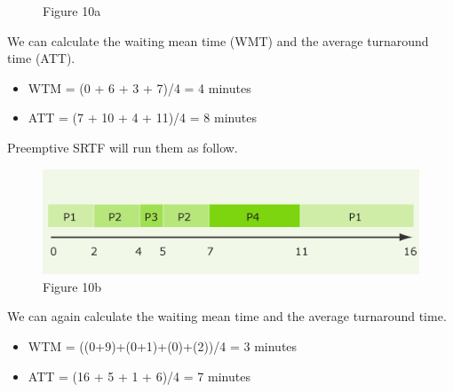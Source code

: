 \documentclass[11pt,a4paper]{scrreprt}
\begin{document}
\begin{itemize}
\begin{figure}[!ht]
\caption{Figure 10a}
\label{fig:figure10a}
\end{figure}
We can calculate the waiting mean time (WMT) and the average turnaround time (ATT).
\begin{itemize}
\item WTM = (0 + 6 + 3 + 7)/4 = 4 minutes
\item ATT = (7 + 10 + 4 + 11)/4 = 8 minutes
\end{itemize}
Preemptive SRTF will run them as follow.
\begin{figure}[!ht]
\centering
\includegraphics[width=0.65\linewidth]{img/Fig10b.png}
\caption{Figure 10b}
\label{fig:figure10b}
\end{figure}
We can again calculate the waiting mean time and the average turnaround time.
\begin{itemize}
\item WTM = ((0+9)+(0+1)+(0)+(2))/4 = 3 minutes
\item ATT = (16 + 5 + 1 + 6)/4 = 7 minutes
\end{itemize}


\end{itemize}
\end{document}
